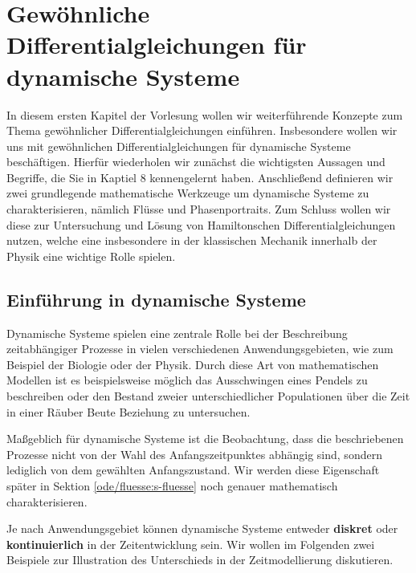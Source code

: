 \chapter{Gewöhnliche Differentialgleichungen für dynamische Systeme}
\label{\detokenize{ode/ode:gewohnliche-differentialgleichungen-fur-dynamische-systeme}}\label{\detokenize{ode/ode::doc}}
\par
In diesem ersten Kapitel der Vorlesung wollen wir weiterführende Konzepte zum Thema gewöhnlicher Differentialgleichungen einführen.
Insbesondere wollen wir uns mit gewöhnlichen Differentialgleichungen für dynamische Systeme beschäftigen.
Hierfür wiederholen wir zunächst die wichtigsten Aussagen und Begriffe, die Sie in Kaptiel 8 \cite{Ten21} kennengelernt haben.
Anschließend definieren wir zwei grundlegende mathematische Werkzeuge um dynamische Systeme zu charakterisieren, nämlich Flüsse und Phasenportraits.
Zum Schluss wollen wir diese zur Untersuchung und Lösung von Hamiltonschen Differentialgleichungen nutzen, welche eine insbesondere in der klassischen Mechanik innerhalb der Physik eine wichtige Rolle spielen.


\section{Einführung in dynamische Systeme}
\label{\detokenize{ode/dynamicSystems:einfuhrung-in-dynamische-systeme}}\label{\detokenize{ode/dynamicSystems::doc}}
\par
Dynamische Systeme spielen eine zentrale Rolle bei der Beschreibung zeitabhängiger Prozesse in vielen verschiedenen Anwendungsgebieten, wie zum Beispiel der Biologie oder der Physik.
Durch diese Art von mathematischen Modellen ist es beispielsweise möglich das Ausschwingen eines Pendels zu beschreiben oder den Bestand zweier unterschiedlicher Populationen über die Zeit in einer Räuber Beute Beziehung zu untersuchen.

\par
Maßgeblich für dynamische Systeme ist die Beobachtung, dass die beschriebenen Prozesse nicht von der Wahl des Anfangszeitpunktes abhängig sind, sondern lediglich von dem gewählten Anfangszustand.
Wir werden diese Eigenschaft später in Sektion \cref{ode/fluesse:s-fluesse}  noch genauer mathematisch charakterisieren.

\par
Je nach Anwendungsgebiet können dynamische Systeme entweder \textbf{diskret} oder \textbf{kontinuierlich} in der Zeitentwicklung sein.
Wir wollen im Folgenden zwei Beispiele zur Illustration des Unterschieds in der Zeitmodellierung diskutieren.


